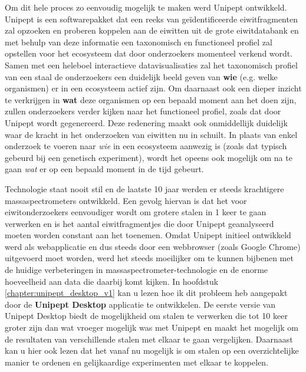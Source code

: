 Om dit hele proces zo eenvoudig mogelijk te maken werd Unipept ontwikkeld.
Unipept is een softwarepakket dat een reeks van geïdentificeerde eiwitfragmenten zal opzoeken en proberen koppelen aan de eiwitten uit de grote eiwitdatabank en met behulp van deze informatie een taxonomisch en functioneel profiel zal opstellen voor het ecosysteem dat door onderzoekers momenteel verkend wordt.
Samen met een heleboel interactieve datavisualisaties zal het taxonomisch profiel van een staal de onderzoekers een duidelijk beeld geven van \textbf{wie} (e.g. welke organismen) er in een ecosysteem actief zijn.
Om daarnaast ook een dieper inzicht te verkrijgen in \textbf{wat} deze organismen op een bepaald moment aan het doen zijn, zullen onderzoekers verder kijken naar het functioneel profiel, zoals dat door Unipept wordt gegenereerd.
Deze redenering maakt ook onmiddellijk duidelijk waar de kracht in het onderzoeken van eiwitten nu in schuilt.
In plaats van enkel onderzoek te voeren naar \textit{wie} in een ecosysteem aanwezig is (zoals dat typisch gebeurd bij een genetisch experiment), wordt het opeens ook mogelijk om na te gaan \textit{wat} er op een bepaald moment in de tijd gebeurt.

Technologie staat nooit stil en de laatste 10 jaar werden er steeds krachtigere massaspectrometers ontwikkeld.
Een gevolg hiervan is dat het voor eiwitonderzoekers eenvoudiger wordt om grotere stalen in 1 keer te gaan verwerken en is het aantal eiwitfragmentjes die door Unipept geanalyseerd moeten worden constant aan het toenemen.
Omdat Unipept initieel ontwikkeld werd als webapplicatie en dus steeds door een webbrowser (zoals Google Chrome) uitgevoerd moet worden, werd het steeds moeilijker om te kunnen bijbenen met de huidige verbeteringen in massaspectrometer-technologie en de enorme hoeveelheid aan data die daarbij komt kijken.
In hoofdstuk \ref{chapter:unipept_desktop_v1} kan u lezen hoe ik dit probleem heb aangepakt door de \textbf{Unipept Desktop} applicatie te ontwikkelen.
De eerste versie van Unipept Desktop biedt de mogelijkheid om stalen te verwerken die tot 10 keer groter zijn dan wat vroeger mogelijk was met Unipept en maakt het mogelijk om de resultaten van verschillende stalen met elkaar te gaan vergelijken.
Daarnaast kan u hier ook lezen dat het vanaf nu mogelijk is om stalen op een overzichtelijke manier te ordenen en gelijkaardige experimenten met elkaar te koppelen.

